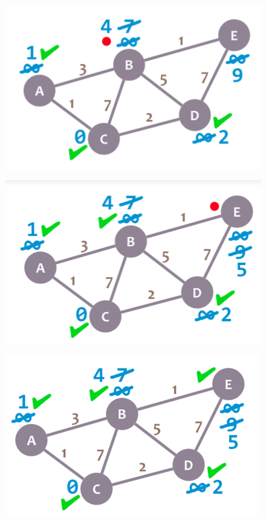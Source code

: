 \documentclass[12pt ,a4paper]{exam}
\begin{document}
\begin{enumerate}[start=1,label={\bfseries Q\arabic*)}]
\begin{figure}[h!]
    		\caption{}
    		\label{fig:screenshot-2020-12-27-at-10}
    	\end{figure}
    	\begin{figure}[h!]
    		\centering
    		\includegraphics[width=0.3\linewidth]{"Screenshot 2020-12-27 at 10.04.40 PM"}
    		\caption{}
    		\label{fig:screenshot-2020-12-27-at-10}
    	\end{figure}
       \clearpage
    	\begin{figure}[h!]
    		\centering
    		\includegraphics[width=0.3\linewidth]{"Screenshot 2020-12-27 at 10.04.46 PM"}
    		\caption{}
    		\label{fig:screenshot-2020-12-27-at-10}
    	\end{figure}
    
    	\begin{figure}[h!]
    		\centering
    		\includegraphics[width=0.3\linewidth]{"Screenshot 2020-12-27 at 10.04.53 PM"}
    		\caption{}
    		\label{fig:screenshot-2020-12-27-at-10}
    	\end{figure}
    

\end{enumerate}
\end{document}
